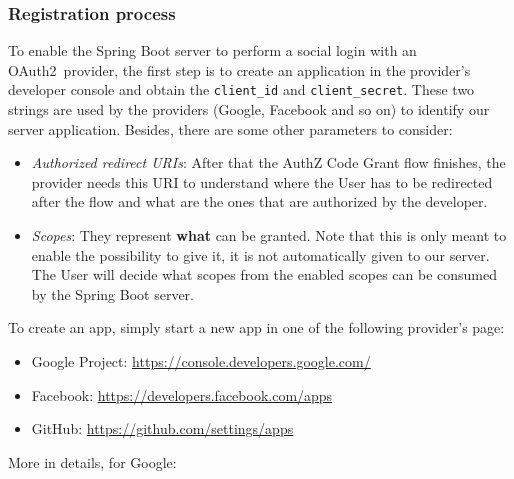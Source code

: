 \documentclass[a4paper,12pt]{article}
\def\oauth{OAuth2\xspace}
\begin{document}
\subsubsection{Registration process}

\label{regprocess}
To enable the Spring Boot server to perform a social login with an \oauth\ provider, the first step is to create an application in the provider's developer console and obtain the \texttt{client\_id} and \texttt{client\_secret}. These two strings are used by the providers (Google, Facebook and so on) to identify our server application. Besides, there are some other parameters to consider:

\begin{itemize}
    \item \textit{Authorized redirect URIs}: After that the AuthZ Code Grant flow finishes, the provider needs this URI to understand where the User has to be redirected after the flow and what are the ones that are authorized by the developer.
    \item \textit{Scopes}: They represent \textbf{what} can be granted. Note that this is only meant to enable the possibility to give it, it is not automatically given to our server. The User will decide what scopes from the enabled scopes can be consumed by the Spring Boot server.
\end{itemize}

To create an app, simply start a new app in one of the following provider's page:

\begin{itemize}
    \item Google Project: \url{https://console.developers.google.com/}
    \item Facebook: \url{https://developers.facebook.com/apps}
    \item GitHub: \url{https://github.com/settings/apps}
\end{itemize}

More in details, for Google:
\end{document}
